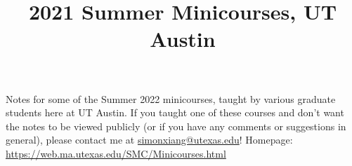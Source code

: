 \documentclass[fontsize=9pt]{article}
\title{2021 Summer Minicourses, UT Austin}
\begin{document}
\maketitle
Notes for some of the Summer 2022 minicourses, taught by various graduate students here at UT Austin. If you taught one of these courses and don't want the notes to be viewed publicly (or if you have any comments or suggestions in general), please contact me at \url{simonxiang@utexas.edu}! Homepage: \url{https://web.ma.utexas.edu/SMC/Minicourses.html}
\tableofcontents
\newpage
     
\clearpage
\printbibliography
\end{document}
